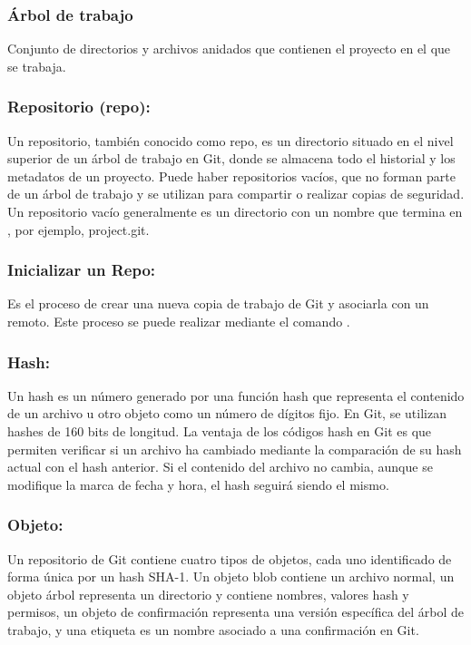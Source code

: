 \subsubsection*{Árbol de trabajo}

Conjunto de directorios y archivos anidados que contienen el proyecto en el que se trabaja.

\subsubsection*{Repositorio (repo):}
Un repositorio, también conocido como repo, es un directorio situado en el nivel superior de un árbol de trabajo en Git,
donde se almacena todo el historial y los metadatos de un proyecto. Puede haber repositorios vacíos, que no forman parte
de un árbol de trabajo y se utilizan para compartir o realizar copias de seguridad. Un repositorio vacío generalmente es
un directorio con un nombre que termina en , por ejemplo, project.git.

\subsubsection*{Inicializar un Repo:} 
Es el proceso de crear una nueva copia de trabajo de Git y asociarla con un remoto. Este proceso se puede realizar mediante
el comando .

\subsubsection*{Hash:}
Un hash es un número generado por una función hash que representa el contenido de un archivo u otro objeto como un
número de dígitos fijo. En Git, se utilizan hashes de 160 bits de longitud. La ventaja de los códigos hash en Git es
que permiten verificar si un archivo ha cambiado mediante la comparación de su hash actual con el hash anterior. Si
el contenido del archivo no cambia, aunque se modifique la marca de fecha y hora, el hash seguirá siendo el mismo.

\subsubsection*{Objeto:}
Un repositorio de Git contiene cuatro tipos de objetos, cada uno identificado de forma única por un hash SHA-1. 
Un objeto blob contiene un archivo normal, un objeto árbol representa un directorio y contiene nombres, valores
hash y permisos, un objeto de confirmación representa una versión específica del árbol de trabajo, y una etiqueta
es un nombre asociado a una confirmación en Git.

